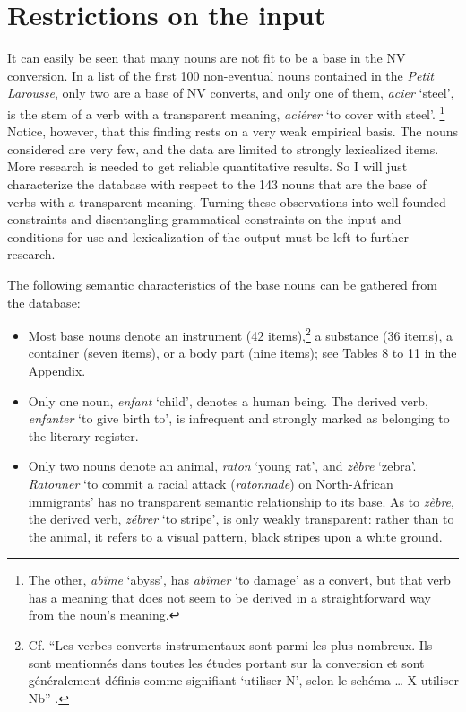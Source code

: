 \documentclass[output=paper]{langsci/langscibook}
\begin{document}
\section{Restrictions on the input}\label{restrictions-on-the-input}

It can easily be seen that many nouns are not fit to be a base in the  N\textrightarrow{}V conversion. In a list of the first 100 non-eventual nouns contained in the \emph{Petit Larousse}, only two are a base of N\textrightarrow{}V converts, and only one of them, \emph{acier} `steel', is the stem of a verb with a transparent meaning, \emph{aciérer} `to cover with steel'.%
\footnote{The other, \emph{abîme} `abyss', has \emph{abîmer} `to damage' as a convert, but that verb has a meaning that does not seem to be derived  in a straightforward way from the noun's meaning.}
Notice, however, that this finding rests on a very weak empirical basis.
The nouns considered are very few, and the data are limited to strongly lexicalized items. More research is needed to get reliable quantitative results. So I will just characterize the database with respect to the
143 nouns that are the base of verbs with a transparent meaning. Turning these observations into well-founded constraints and disentangling grammatical constraints on the input and conditions for use and lexicalization of the output must be left to further research.

The following semantic characteristics of the base nouns can be gathered from the database:

\begin{itemize}
\item Most base nouns denote an instrument (42 items),\footnote{Cf. \enquote{Les verbes converts instrumentaux sont parmi les plus nombreux. Ils sont mentionnés dans toutes les études portant sur la conversion et sont généralement définis comme signifiant `utiliser N', selon le schéma \ldots{} X utiliser Nb} %
\citep[263]{Tribout2010a}%
%
.} a substance (36 items), a container (seven items), or a body part (nine items); see Tables 8 to 11 in the Appendix. \item Only one noun, \emph{enfant} `child', denotes a human being. The
 derived verb, \emph{enfanter} `to give birth to', is infrequent and strongly marked as belonging to the literary register.
\item Only two nouns denote an animal, \emph{raton} `young rat', and
 \emph{zèbre} `zebra'. \emph{Ratonner} `to commit a racial attack (\emph{ratonnade}) on North-African immigrants' has no transparent semantic relationship to its base. As to \emph{zèbre}, the derived verb, \emph{zébrer} `to stripe', is only weakly transparent: rather than to the animal, it refers to a visual pattern, black stripes upon a white ground.
\end{itemize}
\end{document}
